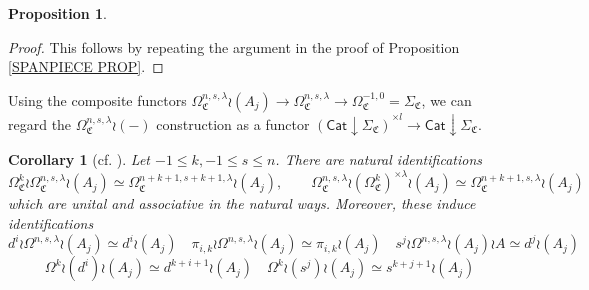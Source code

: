 \documentclass[a4paper,10pt
,draft
]{article}%
\numberwithin{equation}{section}
\numberwithin{figure}{section}
\newtheorem{proposition}[equation]{Proposition}%
\newtheorem{corollary}[equation]{Corollary}%
\theoremstyle{definition} %
\newcommand{\1}{\ensuremath{\mathbbm 1}}%
\newcommand{\OC}{\Omega_{\mathfrak C}}
\begin{document}
\begin{proposition}
\end{proposition}



\begin{proof}
This follows by repeating the argument in the proof of Proposition \ref{SPANPIECE PROP}.
\end{proof}


 
Using the composite functors
$\Omega_{\mathfrak{C}}^{n,s,\lambda} \wr (A_j)
\to \Omega_{\mathfrak{C}}^{n,s,\lambda} 
\to \Omega^{-1,0}_{\mathfrak{C}} = \Sigma_{\mathfrak{C}}$,
we can regard the 
$\Omega_{\mathfrak{C}}^{n,s,\lambda} \wr (-)$
construction as a functor
$\left(\mathsf{Cat}\downarrow \Sigma_{\mathfrak{C}}\right)^{\times l}
\to \mathsf{Cat}\downarrow \Sigma_{\mathfrak{C}}$.

\begin{corollary}[{cf. \cite[Cor. 5.32]{BP_geo}}]
      \label{LABIDEN_COR}
Let $-1 \leq k, -1 \leq s \leq n$.
There are natural identifications
\[
	\OC^k \wr \OC^{n,s,\lambda} \wr (A_j) \simeq
	\OC^{n+k+1,s+k+1,\lambda} \wr (A_j),
\qquad
	\OC^{n,s,\lambda} \wr (\OC^k)^{\times \lambda} \wr (A_j) \simeq
	\OC^{n+k+1,s,\lambda} \wr (A_j)	
\]
which are unital and associative in the natural ways.
Moreover, these induce identifications
\[
d^i \wr \Omega^{n,s,\lambda} \wr (A_j) \simeq d^i \wr (A_j)
	\quad
\pi_{i,k} \wr \Omega^{n,s,\lambda} \wr (A_j) \simeq \pi_{i,k} \wr (A_j)
	\quad
s^j \wr \Omega^{n,s,\lambda} \wr (A_j) \wr A \simeq d^j \wr  (A_j)
\]
\[
\Omega^k \wr (d^i) \wr (A_j) \simeq d^{k+i+1} \wr (A_j)
	\quad
\Omega^k \wr (s^j) \wr (A_j) \simeq s^{k+j+1} \wr (A_j)
\]
\end{corollary}
\end{document}
